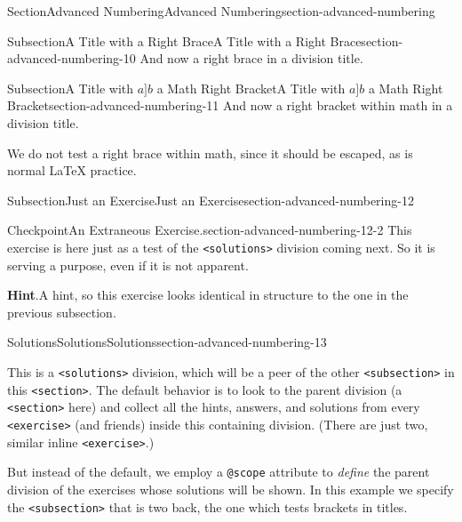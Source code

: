 \documentclass[twoside,10pt,]{article}
\newcommand{\blocktitlefont}{\relax}
\newcommand{\mono}[1]{\texttt{#1}}
\numberwithin{equation}{section}
\begin{document}
\begin{sectionptx}{Section}{Advanced Numbering}{}{Advanced Numbering}{}{}{section-advanced-numbering}
\begin{subsectionptx}{Subsection}{A Title with \textbraceright{} a Right Brace}{}{A Title with \textbraceright{} a Right Brace}{}{}{section-advanced-numbering-10}
And now a right brace in a division title.%
\end{subsectionptx}
%
%
\typeout{************************************************}
\typeout{Subsection 31.9 A Title with \(a]b\) a Math Right Bracket}
\typeout{************************************************}
%
\begin{subsectionptx}{Subsection}{A Title with \(a]b\) a Math Right Bracket}{}{A Title with \(a]b\) a Math Right Bracket}{}{}{section-advanced-numbering-11}
And now a right bracket within math in a division title.%
\par
We do not test a right brace within math, since it should be escaped, as is normal \LaTeX{} practice.%
\end{subsectionptx}
%
%
\typeout{************************************************}
\typeout{************************************************}
%
\begin{subsectionptx}{Subsection}{Just an Exercise}{}{Just an Exercise}{}{}{section-advanced-numbering-12}
\begin{inlineexercise}{Checkpoint}{An Extraneous Exercise.}{section-advanced-numbering-12-2}%
This exercise is here just as a test of the \mono{<solutions>} division coming next.  So it is serving a purpose, even if it is not apparent.%
\par\smallskip%
\noindent\textbf{\blocktitlefont Hint}.\hypertarget{section-advanced-numbering-12-2-3}{}\quad{}A hint, so this exercise looks identical in structure to the one in the previous subsection.%
\end{inlineexercise}%
\end{subsectionptx}
%
%
\typeout{************************************************}
\typeout{************************************************}
%
\begin{solutions-subsection}{Solutions}{Solutions}{}{Solutions}{}{}{section-advanced-numbering-13}
\begin{introduction}{}%
This is a \mono{<solutions>} division, which will be a peer of the other \mono{<subsection>} in this \mono{<section>}. The default behavior is to look to the parent division (a \mono{<section>} here) and collect all the hints, answers, and solutions from every \mono{<exercise>} (and friends) inside this containing division.  (There are just two, similar inline \mono{<exercise>}.)%
\par
But instead of the default, we employ a \mono{@scope} attribute to \emph{define} the parent division of the exercises whose solutions will be shown.  In this example we specify the  \mono{<subsection>} that is two back, the one which tests brackets in titles.%

\end{introduction}
\end{solutions-subsection}
\end{sectionptx}
\end{document}
